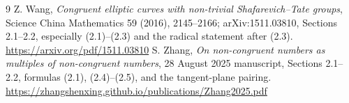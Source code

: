 \documentclass[11pt]{article}
\begin{document}
\begin{thebibliography}{9}
 Z. Wang, \emph{Congruent elliptic curves with non-trivial Shafarevich--Tate groups}, Science China Mathematics 59 (2016), 2145--2166; arXiv:1511.03810, Sections 2.1--2.2, especially (2.1)--(2.3) and the radical statement after (2.3). \url{https://arxiv.org/pdf/1511.03810}
 S. Zhang, \emph{On non-congruent numbers as multiples of non-congruent numbers}, 28 August 2025 manuscript, Sections 2.1--2.2, formulas (2.1), (2.4)--(2.5), and the tangent-plane pairing. \url{https://zhangshenxing.github.io/publications/Zhang2025.pdf}
\end{thebibliography}
\end{document}
